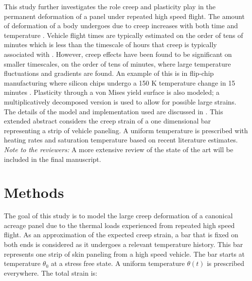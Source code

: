 \documentclass[conf]{new-aiaa}
\begin{document}
This study further investigates the role creep and plasticity play 
in the permanent deformation of a panel under repeated high speed flight.
The amount of deformation of a body undergoes due to creep increases 
with both time and temperature
\cite{roylance_mechanics_of_materials_text}. 
Vehicle flight times are typically estimated on the order
of tens of minutes 
\cite{ 
  kordes_structureal_heating_experiencs_on_the_x15_airplane,
  lafontaine_effects_of_strain_hardeing_on_response_of_skin_panels_in_hypersonic_flow,
  zuchowski_AVIATR_Predictive_capability_for_hypersonic_structural_response_and_life_prediction_phase_II}
which is less than the timescale of hours that creep is 
typically associated with 
\cite{ 
  lavina_creep_behavior_of_Ti6Al4V_from_450C_to_600C,
  evans_effects_of_alpha_case_formation_on_creep_fracture_properties_of_the_high_temperature_titanium_alloy_IMI834,
  roylance_mechanics_of_materials_text}.
However, creep effects have been found to be significant on smaller timescales,
on the order of tens of minutes,
where large temperature fluctuations and gradients are found.
An example of this is in flip-chip manufacturing 
where silicon chips undergo a 150 K temperature change 
in 15 minutes
\cite{ 
  li_simulation_of_finite_strain_inelastic_phenomena_governed_by_creep_and_plasticity}.
Plasticity through a von Mises yield surface is also modeled;
a multiplicatively decomposed version is used to allow for 
possible large strains.
The details of the model and implementation used are
discussed in 
\cite{ li_simulation_of_finite_strain_inelastic_phenomena_governed_by_creep_and_plasticity}.
This extended abstract considers the creep strain of a one dimensional bar
representing a strip of vehicle paneling.
A uniform temperature is prescribed with heating rates and saturation 
temperature based on recent literature estimates.
\newline
\newline
\noindent
\emph{Note to the reviewers:} A more extensive review of the 
state of the art will be included in the 
final manuscript.

\section{Methods} \label{sec_methods}

The goal of this study is to model the large creep deformation of a canonical acreage
panel due to the thermal loads experienced from repeated high speed flight.
As an approximation of the expected creep strain,
a bar that is fixed on both ends is considered as it 
undergoes a relevant temperature history.
This bar represents one strip of skin paneling from 
a high speed vehicle.
The bar starts at temperature $\theta_0$ at a stress free state. 
A uniform temperature $\theta(t)$ is prescribed everywhere.
The total strain is:
\end{document}
